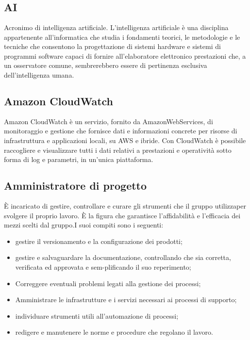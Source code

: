 \section{}
\subsection* {AI} Acronimo di intelligenza artificiale. L'intelligenza artificiale è una disciplina appartenente all'informatica che studia i fondamenti teorici, le metodologie e le tecniche che consentono la progettazione di sistemi hardware e sistemi di programmi software capaci di fornire all'elaboratore elettronico prestazioni che, a un osservatore comune, sembrerebbero essere di pertinenza esclusiva dell’intelligenza umana.
\subsection*{Amazon CloudWatch} Amazon CloudWatch è un servizio, fornito da AmazonWebServices, di monitoraggio e gestione che fornisce dati e informazioni concrete per risorse di infrastruttura e applicazioni locali, su AWS e ibride. Con CloudWatch è possibile raccogliere e visualizzare tutti i dati relativi a prestazioni e operatività sotto forma di log e parametri, in un'unica piattaforma.
\subsection*{Amministratore di progetto} È incaricato di gestire, controllare e curare gli strumenti che il gruppo utilizzaper svolgere il proprio lavoro. È la figura che garantisce l’affidabilità e l’efficacia dei mezzi scelti dal gruppo.I suoi compiti sono i seguenti:
\begin{itemize}
    \item gestire il versionamento e la configurazione dei prodotti;
    \item gestire e salvaguardare la documentazione, controllando che sia corretta, verificata ed approvata e sem-plificando il suo reperimento;
    \item Correggere eventuali problemi legati alla gestione dei processi;
    \item Amministrare le infrastrutture e i servizi necessari ai processi di supporto;
    \item individuare strumenti utili all’automazione di processi;
    \item redigere e manutenere le norme e procedure che regolano il lavoro.
\end{itemize}

